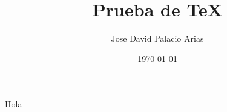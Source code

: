\documentclass{article}
\title{Prueba de \TeX}
\author{Jose David Palacio Arias}
\date{\today}
\begin{document}
\maketitle
Hola
\end{document}
